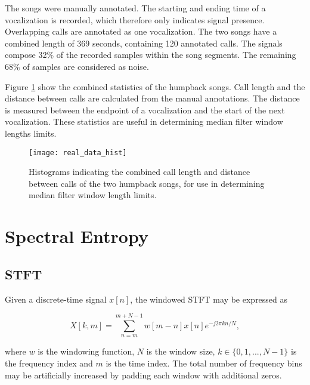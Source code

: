 
The songs were manually annotated. The starting and ending time of a vocalization is recorded, which therefore only indicates signal presence. Overlapping calls are annotated as one vocalization. The two songs have a combined length of 369 seconds, containing 120 annotated calls. The signals compose 32\% of the recorded samples within the song segments. The remaining 68\% of samples are considered as noise.

Figure \ref{fig:fbhist} show the combined statistics of the humpback songs. Call length and the distance between calls are calculated from the manual annotations. The distance is measured between the endpoint of a vocalization and the start of the next vocalization. These statistics are useful in determining median filter window lengths limits.

\begin{figure}[h!]
	\centering
	\texttt{[image: real\_data\_hist]}
	\caption[Humpback call length and time spread.]{Histograms indicating the combined call length and distance between calls of the two humpback songs, for use in determining median filter window length limits.}
	\label{fig:fbhist}
\end{figure}

\section{Spectral Entropy}
\subsection{STFT}
Given a discrete-time signal $x[n]$, the windowed STFT may be expressed as

\begin{equation*}
	X[k, m] = \sum_{n=m}^{m + N - 1} w[m-n] x[n] e^{-j 2 \pi k n / N },
\end{equation*}

\noindent where $w$ is the windowing function, $N$ is the window size, $k \in \{0, 1, ..., N-1\}$ is the frequency index and $m$ is the time index. The total number of frequency bins may be artificially increased by padding each window with additional zeros.

